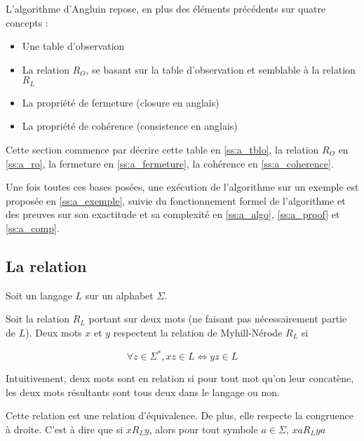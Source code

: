 L'algorithme d'Angluin repose, en plus des éléments précédents sur quatre concepts :

\begin{itemize}
	\item Une table d'observation
	\item La relation $R_O$, se basant sur la table d'observation et semblable à la relation $R_L$
	\item La propriété de fermeture (closure en anglais)
	\item La propriété de cohérence (consistence en anglais)
\end{itemize}

Cette section commence par décrire cette table en \ref{ss:a_tblo}, la relation $R_O$ en \ref{ss:a_ro}, la fermeture en \ref{ss:a_fermeture}, la cohérence en \ref{ss:a_coherence}.

Une fois toutes ces bases posées, une exécution de l'algorithme sur un exemple est proposée en \ref{ss:a_exemple}, suivie du fonctionnement formel de l'algorithme et des preuves sur son exactitude et sa complexité en \ref{ss:a_algo}, \ref{ss:a_proof} et \ref{ss:a_comp}.



\subsection{La relation \rl}

Soit un langage $L$ sur un alphabet $\Sigma$.

Soit la relation $R_L$ portant sur deux mots (ne faisant pas nécessairement partie de $L$). Deux mots $x$ et $y$ respectent la relation de Myhill-Nérode $R_L$ si

$$\forall z \in \Sigma^*, xz \in L \Leftrightarrow yz \in L$$

Intuitivement, deux mots sont en relation si pour tout mot qu'on leur concatène, les deux mots résultants sont tous deux dans le langage ou non.

\begin{lemma}
	Cette relation est une relation d'équivalence. De plus, elle respecte la congruence à droite. C'est à dire que si $xR_Ly$, alors pour tout symbole $a \in \Sigma$, $xaR_Lya$
\end{lemma}


